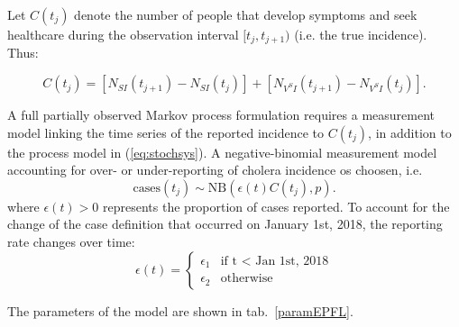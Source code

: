Let \(C(t_j)\) denote the number of people that develop symptoms and seek healthcare during the
observation interval \([t_j, t_{j+1})\) (i.e. the true incidence). Thus:

\begin{equation}
    C(t_j) = [N_{SI}(t_{j+1}) - N_{SI}(t_j)] + [N_{V^SI}(t_{j+1}) - N_{V^SI}(t_j)].
\end{equation}

A full partially observed Markov process formulation requires a measurement model linking the time series of the reported incidence to \(C(t_j)\), in addition to the process model in (\eqref{eq:stochsys}). A negative-binomial measurement model accounting for over- or under-reporting of cholera incidence os choosen, i.e.
\[
	\text{cases}(t_j) \sim \text{NB}(\epsilon(t) C(t_j), p).
\]
where \(\epsilon(t) > 0\) represents the proportion of cases reported. To account for the change of the case definition that occurred on January 1st, 2018, the reporting rate changes over time:
\begin{equation}
\epsilon(t) = \left\{
    \begin{array}{ll}
        \epsilon_1 & \mbox{if t $<$ Jan 1st, 2018} \\
        \epsilon_2 & \mbox{otherwise}
    \end{array}
\right.
\end{equation}

The parameters of the model are shown in tab.~\ref{paramEPFL}.




